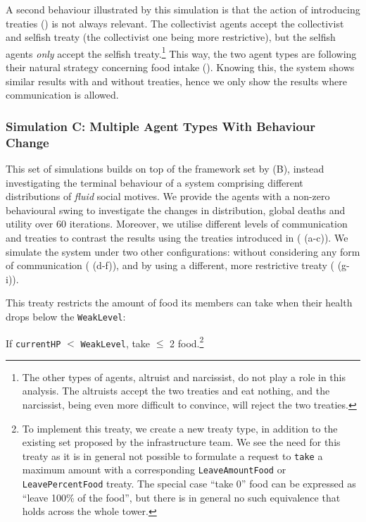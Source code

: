 A second behaviour illustrated by this simulation is that the action of introducing treaties () is not always relevant. The collectivist agents accept the collectivist and selfish treaty (the collectivist one being more restrictive), but the selfish agents \textit{only} accept the selfish treaty.\footnote{The other types of agents, altruist and narcissist, do not play a role in this analysis. The altruists accept the two treaties and eat nothing, and the narcissist, being even more difficult to convince, will reject the two treaties.} This way, the two agent types are following their natural strategy concerning food intake (). Knowing this, the system shows similar results with and without treaties, hence we only show the results where communication is allowed.

\subsubsection{Simulation C: Multiple Agent Types With Behaviour Change}\label{simulation_C}

This set of simulations builds on top of the framework set by (B), instead investigating the terminal behaviour of a system comprising different distributions of \textit{fluid} social motives. We provide the agents with a non-zero behavioural swing to investigate the changes in distribution, global deaths and utility over 60 iterations. Moreover, we utilise different levels of communication and treaties to contrast the results using the treaties introduced in  ( (a-c)). We simulate the system under two other configurations: without considering any form of communication ( (d-f)), and by using a different, more restrictive treaty ( (g-i)).

This treaty restricts the amount of food its members can take when their health drops below the \texttt{WeakLevel}:

If \texttt{currentHP} $<$ \texttt{WeakLevel}, take $\leq$ 2 food.\footnote{To implement this treaty, we create a new treaty type, in addition to the existing set proposed by the infrastructure team. We see the need for this treaty as it is in general not possible to formulate a request to \texttt{take} a maximum amount with a corresponding \texttt{LeaveAmountFood} or \texttt{LeavePercentFood} treaty. The special case ``take 0'' food can be expressed as ``leave 100\% of the food'', but there is in general no such equivalence that holds across the whole tower.}


